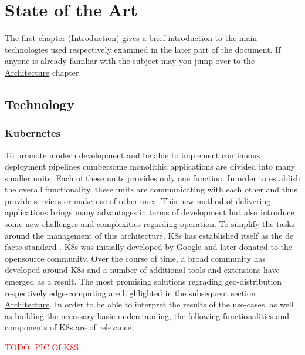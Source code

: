 \documentclass[MSC,Master,english]{twbook}%
\begin{document}
\chapter{State of the Art}
\label{chap:current}
The first chapter (\hyperref[chap:introduction]{Introduction}) gives a brief introduction to the main technologies used respectively examined in the later part of the document. If anyone is already familiar with the subject may you jump over to the \hyperref[sec:architecture]{Architecture} chapter.
\section{Technology}
\label{sec:technology}
\subsection{Kubernetes}
To promote modern development and be able to implement continuous deployment pipelines cumbersome monolithic applications are divided into many smaller units. Each of these units provides only one function. In order to establish the overall functionality, these units are communicating with each other and thus provide services or make use of other ones. This new method of delivering applications brings many advantages in terms of development but also introduce some new challenges and complexities regarding operation. To simplify the tasks around the management of this architecture, \ac{K8s} has established itself as the de facto standard \cite{k8ssurv}. \ac{K8s} was initially developed by Google and later donated to the opensource community. Over the course of time, a broad community has developed around \ac{K8s} and a number of additional tools and extensions have emerged as a result. The most promising solutions regrading geo-distribution respectively edge-computing are highlighted in the subsequent section \hyperref[sec:architecture]{Architecture}. In order to be able to interpret the results of the use-cases, as well as building the necessary basic understanding, the following functionalities and components of \ac{K8s} are of relevance.  

\textcolor{red}{TODO: PIC Of K8S}
\end{document}

